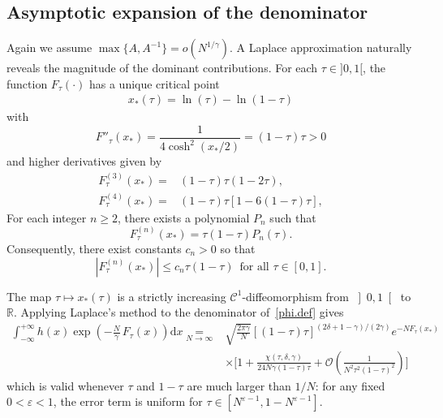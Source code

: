 \documentclass[pdflatex,sn-mathphys-num]{sn-jnl}
\theoremstyle{thmstyleone}
\numberwithin{equation}{section}
\newcommand{\R}{\mathbb{R}}
\begin{document}
\subsection{Asymptotic expansion of the denominator}\label{sec:denom}

Again we assume $\max\{A,A^{-1}\}=o(N^{1/\gamma})$. A Laplace approximation naturally reveals the magnitude of the dominant contributions. For each $\tau\in]0,1[$, the function $F_{\tau}(\cdot)$ has a unique critical point
\begin{align}\label{crit.point}
    x_{*}\left(\tau\right)=\ln(\tau)-\ln(1-\tau)
\end{align}
 with 
\begin{equation}\label{2nd.der}
F''_{\tau}\left(x_{*}\right)=\frac{1}{4\cosh^2( x_*/2)}=(1-\tau) \tau>0
\end{equation}
and higher derivatives given by
\begin{equation}\label{F.expan}
\begin{split}
 F^{(3)}_{\tau}\left(x_{*}\right)=&(1-\tau)\tau(1-2\tau),\\
 F^{(4)}_{\tau}\left(x_{*}\right)=&(1-\tau)\tau[1-6(1-\tau)\tau],
 \end{split}
\end{equation}
For each integer $n\geq 2$, there exists a polynomial $P_{n}$ such that
\begin{equation}
    F^{(n)}_{\tau}(x_{*})=\tau(1-\tau)P_{n}(\tau).
\end{equation}
Consequently, there exist constants $c_{n}>0$ so that
\begin{equation}
    \left| F^{(n)}_{\tau}(x_{*})\right|\leq c_{n}\tau(1-\tau)\,\text{ for all }\tau\in[0,1].
\end{equation}

\noindent The map $\tau\mapsto x_{*}\left( \tau \right)$ is a strictly increasing $\mathscr{C}^{1}$-diffeomorphism from $\left] 0,1 \right[$ to $\R$.
Applying Laplace's method to the denominator of~\eqref{phi.def} gives
\begin{equation}\label{denom.expan}
\begin{split}
    \int_{-\infty}^{+\infty}h\left( x \right)\exp\left(-\frac{N}{\gamma}\,F_{\tau}\left( x \right) \right)\mathrm{d}x\underset{N\to \infty}{=}&\sqrt{\frac{2\pi\gamma}{N }}[(1-\tau)\tau]^{(2\delta+1-\gamma)/(2\gamma)}e^{-NF_\tau(x_*)}\\
    &\times\biggl[1+\frac{\chi(\tau,\delta,\gamma)}{24N\gamma(1-\tau)\tau }+\mathcal{O}\left(\frac{1}{N^2\tau^2(1-\tau)^2}\right)\biggl]
 \end{split}
\end{equation}
which is valid whenever $\tau$ and $1-\tau$ are much larger than $1/N$: for any fixed $0<\varepsilon<1$, the error term is uniform for $\tau\in[N^{\varepsilon-1},1-N^{\varepsilon-1}]$.
\end{document}
